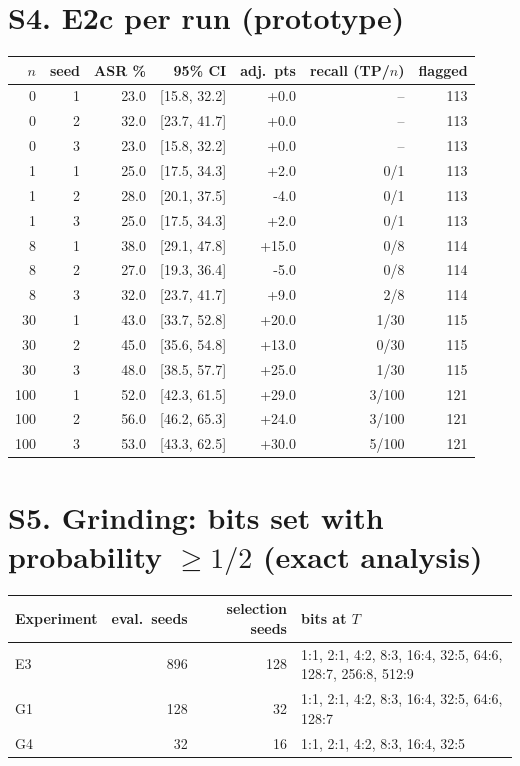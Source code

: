 \documentclass[10pt,a4paper]{article}
\begin{document}
\section{S4. E2c per run (prototype)}
\begin{tabular}{rrrrrrr}\toprule $n$ & seed & ASR \% & 95\% CI & adj.\ pts & recall (TP/$n$) & flagged\\\midrule
0 & 1 & 23.0 & [15.8, 32.2] & +0.0 & -- & 113\\
0 & 2 & 32.0 & [23.7, 41.7] & +0.0 & -- & 113\\
0 & 3 & 23.0 & [15.8, 32.2] & +0.0 & -- & 113\\
1 & 1 & 25.0 & [17.5, 34.3] & +2.0 & 0/1 & 113\\
1 & 2 & 28.0 & [20.1, 37.5] & -4.0 & 0/1 & 113\\
1 & 3 & 25.0 & [17.5, 34.3] & +2.0 & 0/1 & 113\\
8 & 1 & 38.0 & [29.1, 47.8] & +15.0 & 0/8 & 114\\
8 & 2 & 27.0 & [19.3, 36.4] & -5.0 & 0/8 & 114\\
8 & 3 & 32.0 & [23.7, 41.7] & +9.0 & 2/8 & 114\\
30 & 1 & 43.0 & [33.7, 52.8] & +20.0 & 1/30 & 115\\
30 & 2 & 45.0 & [35.6, 54.8] & +13.0 & 0/30 & 115\\
30 & 3 & 48.0 & [38.5, 57.7] & +25.0 & 1/30 & 115\\
100 & 1 & 52.0 & [42.3, 61.5] & +29.0 & 3/100 & 121\\
100 & 2 & 56.0 & [46.2, 65.3] & +24.0 & 3/100 & 121\\
100 & 3 & 53.0 & [43.3, 62.5] & +30.0 & 5/100 & 121\\
\bottomrule\end{tabular}
\section{S5. Grinding: bits set with probability $\ge 1/2$ (exact analysis)}
\begin{tabular}{lrrl}\toprule Experiment & eval.\ seeds & selection seeds & bits at $T$\\\midrule
E3 & 896 & 128 & 1:1, 2:1, 4:2, 8:3, 16:4, 32:5, 64:6, 128:7, 256:8, 512:9\\
G1 & 128 & 32 & 1:1, 2:1, 4:2, 8:3, 16:4, 32:5, 64:6, 128:7\\
G4 & 32 & 16 & 1:1, 2:1, 4:2, 8:3, 16:4, 32:5\\
\bottomrule\end{tabular}
\end{document}
